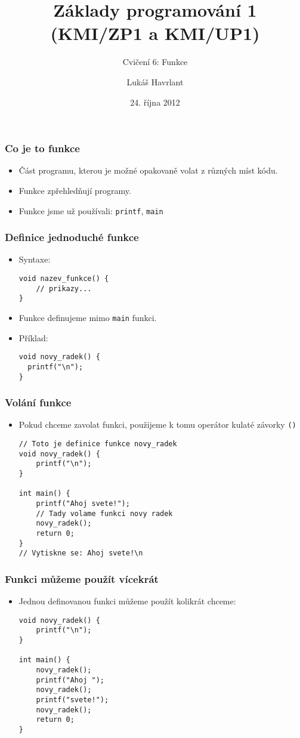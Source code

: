 \documentclass{beamer}
\title{Základy programování 1 (KMI/ZP1 a KMI/UP1)}
\subtitle{Cvičení 6: Funkce}
\author{Lukáš Havrlant}
\date{24. října 2012}
\institute{Univerzita Palackého}
\newenvironment{itemizex}%
  {\large \begin{itemize}%
    \setlength{\itemsep}{8pt}%
    \setlength{\parskip}{8pt}}%
  {\end{itemize}}
\begin{document}
\begin{frame}[t,plain]
\titlepage
\end{frame}


\begin{frame}[t,fragile]\frametitle{Co je to funkce} 
    \begin{itemizex}
        \item Část programu, kterou je možné opakovaně volat z různých míst kódu.
        \item Funkce zpřehledňují programy.
        \item Funkce jsme už používali: \texttt{printf}, \texttt{main}
    \end{itemizex}
\end{frame}


\begin{frame}[t,fragile]\frametitle{Definice jednoduché funkce} 
    \begin{itemizex}
        \item Syntaxe:
        \begin{verbatim} 
void nazev_funkce() {
    // prikazy...
}
        \end{verbatim}
        \item Funkce definujeme mimo \texttt{main} funkci.
        \item Příklad:
        \begin{verbatim} 
void novy_radek() {
  printf("\n");
}
        \end{verbatim}
    \end{itemizex}
\end{frame}


\begin{frame}[t,fragile]\frametitle{Volání funkce} 
    \begin{itemize}
        \item Pokud chceme zavolat funkci, použijeme k tomu operátor kulaté závorky \texttt{()}
        \begin{verbatim} 
// Toto je definice funkce novy_radek
void novy_radek() {
    printf("\n");
}

int main() {
    printf("Ahoj svete!"); 
    // Tady volame funkci novy radek
    novy_radek(); 
    return 0;         
}
// Vytiskne se: Ahoj svete!\n
        \end{verbatim}
    \end{itemize}
\end{frame}


\begin{frame}[t,fragile]\frametitle{Funkci můžeme použít vícekrát} 
    \begin{itemize}
        \item Jednou definovanou funkci můžeme použít kolikrát chceme:
        \begin{verbatim} 
void novy_radek() {
    printf("\n");
}

int main() {
    novy_radek();
    printf("Ahoj ");
    novy_radek();
    printf("svete!");
    novy_radek();
    return 0;
}
        \end{verbatim}
    \end{itemize}
\end{frame}
\end{document}
